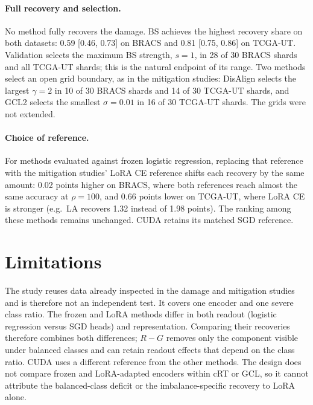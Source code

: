 \documentclass[11pt]{article}
\begin{document}
\paragraph{Full recovery and selection.}
No method fully recovers the damage. BS achieves the highest recovery share on both datasets: 0.59 [0.46, 0.73] on BRACS and 0.81 [0.75, 0.86] on TCGA-UT. Validation selects the maximum BS strength, $s=1$, in 28 of 30 BRACS shards and all TCGA-UT shards; this is the natural endpoint of its range. Two methods select an open grid boundary, as in the mitigation studies: DisAlign selects the largest $\gamma=2$ in 10 of 30 BRACS shards and 14 of 30 TCGA-UT shards, and GCL2 selects the smallest $\sigma=0.01$ in 16 of 30 TCGA-UT shards. The grids were not extended.

\paragraph{Choice of reference.}
For methods evaluated against frozen logistic regression, replacing that reference with the mitigation studies' LoRA CE reference shifts each recovery by the same amount: 0.02 points higher on BRACS, where both references reach almost the same accuracy at $\rho=100$, and 0.66 points lower on TCGA-UT, where LoRA CE is stronger (e.g.\ LA recovers 1.32 instead of 1.98 points). The ranking among these methods remains unchanged. CUDA retains its matched SGD reference.

\section{Limitations}
\label{sec:limitations}
The study reuses data already inspected in the damage and mitigation studies and is therefore not an independent test. It covers one encoder and one severe class ratio. The frozen and LoRA methods differ in both readout (logistic regression versus SGD heads) and representation. Comparing their recoveries therefore combines both differences; $R-G$ removes only the component visible under balanced classes and can retain readout effects that depend on the class ratio. CUDA uses a different reference from the other methods. The design does not compare frozen and LoRA-adapted encoders within cRT or GCL, so it cannot attribute the balanced-class deficit or the imbalance-specific recovery to LoRA alone.



\end{document}
